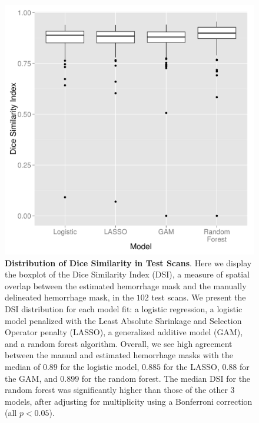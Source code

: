 \documentclass{elsarticle_nonatbib}\usepackage[]{graphicx}\usepackage[]{color}
\begin{document}
\begin{figure}
\centering
\includegraphics[width=0.75\linewidth,keepaspectratio]{Reseg_Dice_Comparison.png}
\caption{{\bf Distribution of Dice Similarity in Test Scans}.  Here we display the boxplot of the Dice Similarity Index (DSI), a measure of spatial overlap between the estimated hemorrhage mask and the manually delineated hemorrhage mask, in the $102$ test scans.  We present the DSI distribution for each model fit: a logistic regression, a logistic model penalized with the Least Absolute Shrinkage and Selection Operator penalty (LASSO), a generalized additive model (GAM), and a random forest algorithm.  Overall, we see high agreement between the manual and estimated hemorrhage masks with the median of $0.89$ for the logistic model, $0.885$ for the LASSO, $0.88$ for the GAM, and $0.899$ for the random forest. The median DSI for the random forest was significantly higher than those of the other 3 models, after adjusting for multiplicity using a Bonferroni correction (all $p < 0.05$).   }
\label{fig:dice}
\end{figure}
\end{document}
